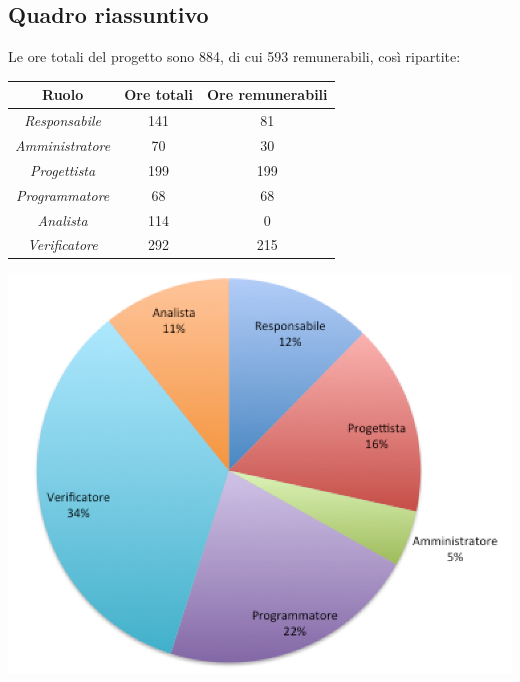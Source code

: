 \subsection{Quadro riassuntivo}
Le ore totali del progetto sono 884, di cui 593 remunerabili, così ripartite:
\begin{center}
  \centering
  \begin{tabular}{|c|c|c|}
    \hline
    \textbf{Ruolo} & \textbf{Ore totali} & \textbf{Ore remunerabili} \\
    \hline
     \emph{Responsabile}  & 141 & 81 \\
    \hline  \emph{Amministratore}  & 70 & 30 \\
    \hline  \emph{Progettista}  & 199 & 199 \\
    \hline  \emph{Programmatore}  & 68 & 68 \\
    \hline  \emph{Analista}  & 114 & 0 \\
    \hline  \emph{Verificatore}  & 292 & 215 \\
    \hline
  \end{tabular}
  \includegraphics[scale=0.7]{img/grafico7.png}

\end{center}
